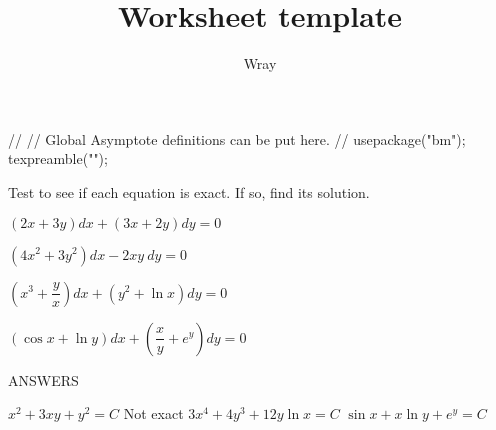 \documentclass[addpoints, 12pt]{exam}
\title{Worksheet template}
\author{Wray}
\begin{document}
\begin{asydef}
//
// Global Asymptote definitions can be put here.
//
usepackage("bm");
texpreamble("\def\V#1{\bm{#1}}");
\end{asydef}

\bigskip
\smallskip

Test to see if each equation is exact.  If so, find its solution.
\begin{questions}

\question
$\left( 2x + 3y \right) dx + \left( 3x + 2y  \right) dy = 0$

\question
$\left( 4x^2 + 3y^2 \right) dx - 2xy \> dy = 0$

\question
$\left( x^3 + \dfrac{y}{x} \right) dx + \left( y^2 + \ln x \right) dy = 0$

\question
$\left( \cos x + \ln y  \right) dx + \left( \dfrac{x}{y} + e^y \right) dy = 0$

\end{questions}

\clearpage
\bigskip
ANSWERS
\bigskip

\begin{questions}
\question $x^2 + 3xy + y^2 = C$
\question Not exact
\question $3x^4 + 4y^3 + 12 y \ln x = C$
\question $\sin x + x \ln y + e^y = C$
\end{questions}
\end{document}
